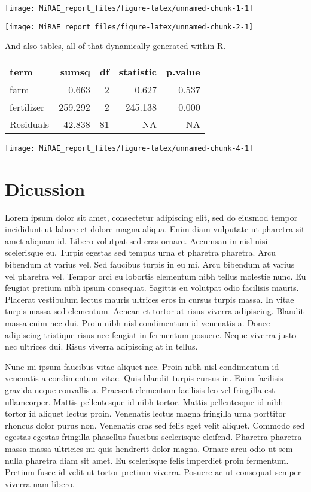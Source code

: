 \documentclass[
]{article}
\begin{document}
\begin{center}\texttt{[image: MiRAE\_report\_files/figure-latex/unnamed-chunk-1-1]} \end{center}

\begin{center}\texttt{[image: MiRAE\_report\_files/figure-latex/unnamed-chunk-2-1]} \end{center}
\newpage

And also tables, all of that dynamically generated within R.

\begin{longtable}[]{@{}lrrrr@{}}
\toprule
term & sumsq & df & statistic & p.value\tabularnewline
\midrule
\endhead
farm & 0.663 & 2 & 0.627 & 0.537\tabularnewline
fertilizer & 259.292 & 2 & 245.138 & 0.000\tabularnewline
Residuals & 42.838 & 81 & NA & NA\tabularnewline
\bottomrule
\end{longtable}

\begin{center}\texttt{[image: MiRAE\_report\_files/figure-latex/unnamed-chunk-4-1]} \end{center}

\hypertarget{dicussion}{%
\section{Dicussion}\label{dicussion}}

Lorem ipsum dolor sit amet, consectetur adipiscing elit, sed do eiusmod
tempor incididunt ut labore et dolore magna aliqua. Enim diam vulputate
ut pharetra sit amet aliquam id. Libero volutpat sed cras ornare.
Accumsan in nisl nisi scelerisque eu. Turpis egestas sed tempus urna et
pharetra pharetra. Arcu bibendum at varius vel. Sed faucibus turpis in
eu mi. Arcu bibendum at varius vel pharetra vel. Tempor orci eu lobortis
elementum nibh tellus molestie nunc. Eu feugiat pretium nibh ipsum
consequat. Sagittis eu volutpat odio facilisis mauris. Placerat
vestibulum lectus mauris ultrices eros in cursus turpis massa. In vitae
turpis massa sed elementum. Aenean et tortor at risus viverra
adipiscing. Blandit massa enim nec dui. Proin nibh nisl condimentum id
venenatis a. Donec adipiscing tristique risus nec feugiat in fermentum
posuere. Neque viverra justo nec ultrices dui. Risus viverra adipiscing
at in tellus.

Nunc mi ipsum faucibus vitae aliquet nec. Proin nibh nisl condimentum id
venenatis a condimentum vitae. Quis blandit turpis cursus in. Enim
facilisis gravida neque convallis a. Praesent elementum facilisis leo
vel fringilla est ullamcorper. Mattis pellentesque id nibh tortor.
Mattis pellentesque id nibh tortor id aliquet lectus proin. Venenatis
lectus magna fringilla urna porttitor rhoncus dolor purus non. Venenatis
cras sed felis eget velit aliquet. Commodo sed egestas egestas fringilla
phasellus faucibus scelerisque eleifend. Pharetra pharetra massa massa
ultricies mi quis hendrerit dolor magna. Ornare arcu odio ut sem nulla
pharetra diam sit amet. Eu scelerisque felis imperdiet proin fermentum.
Pretium fusce id velit ut tortor pretium viverra. Posuere ac ut
consequat semper viverra nam libero.
\end{document}
